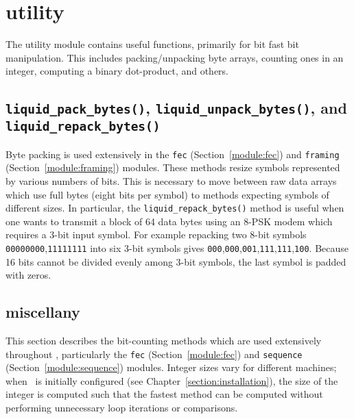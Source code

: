 % 
%

\newpage
\section{utility}
\label{module:utility}
The utility module contains useful functions, primarily for bit fast bit
manipulation.
This includes packing/unpacking byte arrays, counting ones in an integer,
computing a binary dot-product, and others.

\subsection{{\tt liquid\_pack\_bytes()},
            {\tt liquid\_unpack\_bytes()}, and
            {\tt liquid\_repack\_bytes()}}
\label{module:utility:pack_bytes}
Byte packing is used extensively in the
{\tt fec} (Section~\ref{module:fec}) and
{\tt framing} (Section~\ref{module:framing}) modules.
These methods resize symbols represented by various numbers of bits.
This is necessary to move between raw data arrays which use full bytes (eight
bits per symbol) to methods expecting symbols of different sizes.
In particular, the {\tt liquid\_repack\_bytes()} method is useful when one wants
to transmit a block of 64 data bytes using an 8-PSK modem which requires a
3-bit input symbol.
For example repacking two 8-bit symbols {\tt 00000000},{\tt 11111111} into six
3-bit symbols gives
{\tt 000},{\tt 000},{\tt 001},{\tt 111},{\tt 111},{\tt 100}.
Because 16 bits cannot be divided evenly among 3-bit symbols, the last symbol
is padded with zeros.

\subsection{miscellany}
\label{module:utility:misc}
This section describes the bit-counting methods which are used extensively
throughout \liquid, particularly the
{\tt fec} (Section~\ref{module:fec}) and
{\tt sequence} (Section~\ref{module:sequence}) modules.
Integer sizes vary for different machines;
when \liquid\ is initially configured (see Chapter~\ref{section:installation}), the
size of the integer is computed such that the fastest method can be computed
without performing unnecessary loop iterations or comparisons.

